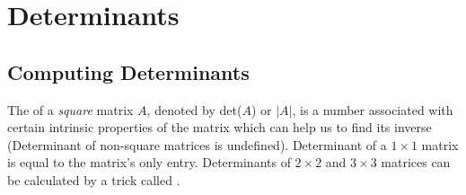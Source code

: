 \section{Determinants}
\label{section:det}
\subsection{Computing Determinants}
The  of a \textit{square} matrix $A$, denoted by det($A$) or $|A|$, is a number associated with certain intrinsic properties of the matrix which can help us to find its inverse (Determinant of non-square matrices is undefined). Determinant of a $1 \times 1$ matrix is equal to the matrix's only entry. Determinants of $2 \times 2$ and $3 \times 3$ matrices can be calculated by a trick called .
